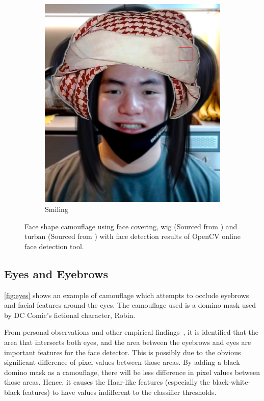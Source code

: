 \documentclass[10pt,twocolumn,letterpaper]{article}
\begin{document}
\begin{figure}[t]
\begin{subfigure}[b]{.49\linewidth}
        \includegraphics[width=\linewidth]{Figures/face_shape_3.png}
        \caption{Smiling}
    \end{subfigure}
    
    
    \caption{Face shape camouflage using face covering, wig (Sourced from \cite{wig}) and turban (Sourced from \cite{turban}) with face detection results of OpenCV online face detection tool.}
    \label{fig:face-shape}
\end{figure}

\subsection{Eyes and Eyebrows} \label{sec:eyes}

\cref{fig:eyes} shows an example of camouflage which attempts to occlude eyebrows and facial features around the eyes. The camouflage used is a domino mask used by DC Comic's fictional character, Robin.

From personal observations and other empirical findings~\cite{cvdazzle}, it is identified that the area that intersects both eyes, and the area between the eyebrows and eyes are important features for the face detector. This is possibly due to the obvious significant difference of pixel values between those areas. By adding a black domino mask as a camouflage, there will be less difference in pixel values between those areas. Hence, it causes the Haar-like features (especially the black-white-black features) to have values indifferent to the classifier thresholds.
\end{document}
